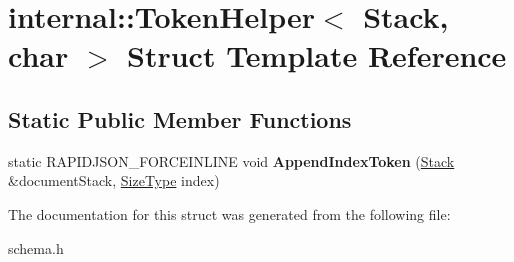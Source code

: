 \hypertarget{a00307}{}\section{internal\+:\+:Token\+Helper$<$ Stack, char $>$ Struct Template Reference}
\label{a00307}
\subsection*{Static Public Member Functions}
\begin{DoxyCompactItemize}
\item 
static R\+A\+P\+I\+D\+J\+S\+O\+N\+\_\+\+F\+O\+R\+C\+E\+I\+N\+L\+I\+NE void {\bfseries Append\+Index\+Token} (\hyperlink{a00283}{Stack} \&document\+Stack, \hyperlink{a00677_a5ed6e6e67250fadbd041127e6386dcb5}{Size\+Type} index)\hypertarget{a00307_a5d635eb7590e098c3340c9e5dcc72ae3}{}\label{a00307_a5d635eb7590e098c3340c9e5dcc72ae3}

\end{DoxyCompactItemize}


The documentation for this struct was generated from the following file\+:\begin{DoxyCompactItemize}
\item 
schema.\+h\end{DoxyCompactItemize}
